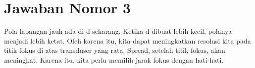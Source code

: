 \section{Jawaban Nomor 3}
Pola lapangan jauh ada di d sekarang. Ketika d dibuat lebih kecil, polanya menjadi lebih ketat. Oleh karena itu, kita dapat meningkatkan resolusi kita pada titik fokus di atas transduser yang rata. Spread, setelah titik fokus, akan meningkat. Karena itu, kita perlu memilih jarak fokus dengan hati-hati.